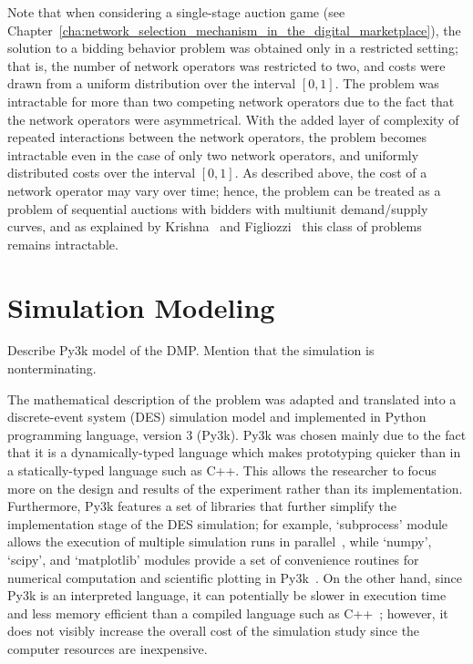 Note that when considering a single-stage auction game (see Chapter~\ref{cha:network_selection_mechanism_in_the_digital_marketplace}), the solution to a bidding behavior problem was obtained only in a restricted setting; that is, the number of network operators was restricted to two, and costs were drawn from a uniform distribution over the interval $[0,1]$. The problem was intractable for more than two competing network operators due to the fact that the network operators were asymmetrical. With the added layer of complexity of repeated interactions between the network operators, the problem becomes intractable even in the case of only two network operators, and uniformly distributed costs over the interval $[0,1]$. As described above, the cost of a network operator may vary over time; hence, the problem can be treated as a problem of sequential auctions with bidders with multiunit demand/supply curves, and as explained by Krishna~\cite{Krishna10} and Figliozzi~\cite{FigliozziJaillet2008} this class of problems remains intractable.

\section{Simulation Modeling} %
\label{sec:simulation_modeling_dynamic}
Describe Py3k model of the DMP. Mention that the simulation is nonterminating.

The mathematical description of the problem was adapted and translated into a discrete-event system (DES) simulation model and implemented in Python programming language, version 3 (Py3k). Py3k was chosen mainly due to the fact that it is a dynamically-typed language which makes prototyping quicker than in a statically-typed language such as C++. This allows the researcher to focus more on the design and results of the experiment rather than its implementation. Furthermore, Py3k features a set of libraries that further simplify the implementation stage of the DES simulation; for example, `subprocess' module allows the execution of multiple simulation runs in parallel~\cite{Py3kSubprocess}, while `numpy', `scipy', and `matplotlib' modules provide a set of convenience routines for numerical computation and scientific plotting in Py3k~\cite{Numpy, Scipy, Matplotlib}. On the other hand, since Py3k is an interpreted language, it can potentially be slower in execution time and less memory efficient than a compiled language such as C++~\cite{Py3kC++}; however, it does not visibly increase the overall cost of the simulation study since the computer resources are inexpensive.

